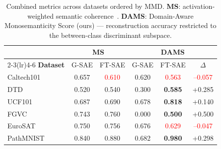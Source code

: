 \begin{table}
\centering
\vspace{-10pt}
\caption{Combined metrics across datasets ordered by MMD.
\textbf{MS}: activation-weighted semantic coherence~\cite{pach2025monosemantic}.
\textbf{DAMS}: Domain-Aware Monosemanticity Score (ours) --- reconstruction
accuracy restricted to the between-class discriminant subspace.
}
\label{tab:combined_ms_dams}
\vspace{4pt}
\small
\setlength{\tabcolsep}{3.5pt}
\renewcommand{\arraystretch}{0.95}
\begin{tabular}{l cc ccc}
\toprule
 & \multicolumn{2}{c}{\textbf{MS}} & \multicolumn{3}{c}{\textbf{DAMS}} \\
\cmidrule(lr){2-3}\cmidrule(lr){4-6}
\textbf{Dataset} & G-SAE & FT-SAE & G-SAE & FT-SAE & $\Delta$ \\
\midrule
Caltech101 & 0.657 & \textcolor{red}{0.610} & 0.620 & \textcolor{red}{0.563} & \textcolor{red}{--0.057} \\
DTD        & 0.520 & 0.540                   & 0.300 & \textbf{0.585}         & +0.285 \\
UCF101     & 0.687 & 0.690                   & 0.678 & \textbf{0.818}         & +0.140 \\
FGVC       & 0.743 & 0.760                   & 0.000 & \textbf{0.500}         & +0.500 \\
EuroSAT    & 0.750 & 0.756                   & 0.676 & \textcolor{red}{0.629} & \textcolor{red}{--0.047} \\
PathMNIST  & 0.840 & 0.880                   & 0.682 & \textbf{0.980}         & +0.298 \\
\bottomrule
\end{tabular}
\vspace{-10pt}
\end{table}